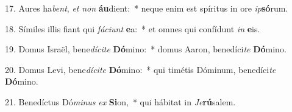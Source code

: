 17. Aures ha\textit{bent}, \textit{et} \textit{non} \textbf{áu}dient:~*  neque enim est spíritus in ore \textit{ip}\textbf{só}rum.\

18. Símiles illis fiant qui \textit{fá}\textit{ci}\textit{unt} \textbf{e}a:~*  et omnes qui confídunt \textit{in} \textbf{e}is.\

19. Domus Israël, bene\textit{dí}\textit{ci}\textit{te} \textbf{Dó}mino:~*  domus Aaron, benedíci\textit{te} \textbf{Dó}mino.\

20. Domus Levi, bene\textit{dí}\textit{ci}\textit{te} \textbf{Dó}mino:~*  qui timétis Dóminum, benedíci\textit{te} \textbf{Dó}mino.\

21. Benedíctus Dó\textit{mi}\textit{nus} \textit{ex} \textbf{Si}on,~*  qui hábitat in \textit{Je}\textbf{rú}salem.\

